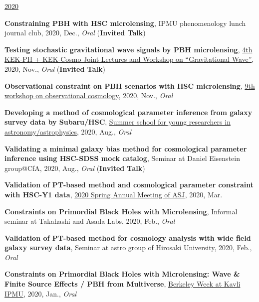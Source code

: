 \underline{2020}
\begin{etaremune}
\setcounter{enumi}{16}
\item \textbf{Constraining PBH with HSC microlensing}, IPMU phenomenology lunch journal club, 2020, Dec., \textit{Oral} (\textbf{Invited Talk})
\item \textbf{Testing stochastic gravitational wave signals by PBH microlensing}, \href{http://conference-indico.kek.jp/event/117/timetable/#day-2020-11-04}{4th KEK-PH + KEK-Cosmo Joint Lectures and Workshop on ``Gravitational Wave''}, 2020, Nov., \textit{Oral} (\textbf{Invited Talk})
\item \textbf{Observational constraint on PBH scenarios with HSC microlensing}, \href{https://indico.ipmu.jp/event/382/timetable/#all}{9th workshop on observational cosmology}, 2020, Nov., \textit{Oral}
\item \textbf{Developing a method of cosmological parameter inference from galaxy survey data by Subaru/HSC}, \href{http://www.astro-wakate.org/ss2019/web/}{Summer school for young researchers in astronomy/astrophysics}, 2020, Aug., \textit{Oral}
\item \textbf{Validating a minimal galaxy bias method for cosmological parameter inference using HSC-SDSS mock catalog}, Seminar at Daniel Eisenstein group@CfA, 2020, Aug., \textit{Oral} (\textbf{Invited Talk})
\item \textbf{Validation of PT-based method and cosmological parameter constraint with HSC-Y1 data}, \href{http://www.asj.or.jp/nenkai/archive/2020a/pdf/U03a.pdf}{2020 Spring Annual Meeting of ASJ}, 2020, Mar.
\item \textbf{Constraints on Primordial Black Holes with Microlensing}, Informal seminar at Takahashi and Asada Labs, 2020, Feb., \textit{Oral}
\item \textbf{Validation of PT-based method for cosmology analysis with wide field galaxy survey data}, Seminar at astro group of Hirosaki University, 2020, Feb., \textit{Oral}
\item \textbf{Constraints on Primordial Black Holes with Microlensing: Wave \& Finite Source Effects / PBH from Multiverse}, \href{http://indico.ipmu.jp/event/313/overview}{Berkeley Week at Kavli IPMU}, 2020, Jan., \textit{Oral}
\end{etaremune}

